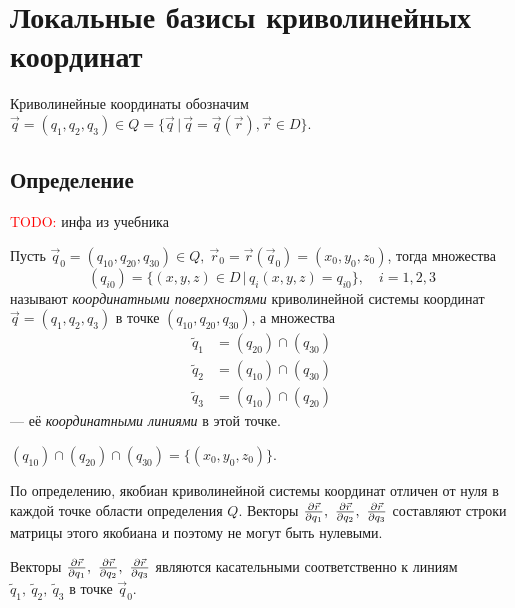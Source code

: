 \section{Локальные базисы криволинейных координат}

Криволинейные координаты обозначим $\vec{q} = (q_1, q_2, q_3) \in
Q = \{ \vec{q} \, | \, \vec{q} = \vec{q}(\vec{r}), \vec{r} \in D \}$.

\subsection{Определение}

\textcolor{red}{TODO:} инфа из учебника

\begin{definition}
  Пусть $\vec{q}_0 = (q_{10}, q_{20}, q_{30}) \in Q,~\vec{r}_0 =
  \vec{r}(\vec{q}_0) = (x_0, y_0, z_0)$, тогда множества
  \begin{equation}
    (q_{i0}) = \{ (x,y,z) \in D \, | \, q_i(x,y,z) = q_{i0} \}, \quad i = 1,2,3
  \end{equation}
  называют \textit{координатными поверхностями} криволинейной системы координат
  $\vec{q} = (q_1, q_2, q_3)$ в точке $(q_{10}, q_{20}, q_{30})$, а множества
  \begin{equation}
    \begin{aligned}
      \tilde{q}_1 &= (q_{20}) \cap (q_{30}) \\
      \tilde{q}_2 &= (q_{10}) \cap (q_{30}) \\
      \tilde{q}_3 &= (q_{10}) \cap (q_{20})
    \end{aligned}
  \end{equation}
  --- её \textit{координатными линиями} в этой точке.
\end{definition}

\begin{remark}
  $(q_{10}) \cap (q_{20}) \cap (q_{30}) = \{ (x_0, y_0, z_0) \}$.
\end{remark}

По определению, якобиан криволинейной системы координат отличен от нуля в
каждой точке области определения $Q$. Векторы
$\parder[\vec{r}]{q_1},~\parder[\vec{r}]{q_2},~\parder[\vec{r}]{q_3}$
составляют строки матрицы этого якобиана и поэтому не могут быть нулевыми.

\begin{theorem}
  Векторы $\parder[\vec{r}]{q_1},~\parder[\vec{r}]{q_2},~\parder[\vec{r}]{q_3}$
  являются касательными соответственно к линиям
  $\tilde{q}_1,~\tilde{q}_2,~\tilde{q}_3$ в точке $\vec{q}_0$.
\end{theorem}

